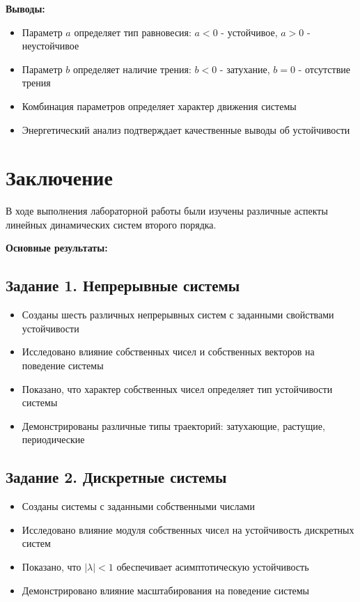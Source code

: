 \textbf{Выводы:}
\begin{itemize}
    \item Параметр $a$ определяет тип равновесия: $a < 0$ - устойчивое, $a > 0$ - неустойчивое
    \item Параметр $b$ определяет наличие трения: $b < 0$ - затухание, $b = 0$ - отсутствие трения
    \item Комбинация параметров определяет характер движения системы
    \item Энергетический анализ подтверждает качественные выводы об устойчивости
\end{itemize}

\section*{Заключение}

В ходе выполнения лабораторной работы были изучены различные аспекты линейных динамических систем второго порядка.

\textbf{Основные результаты:}

\subsection*{Задание 1. Непрерывные системы}

\begin{itemize}
    \item Созданы шесть различных непрерывных систем с заданными свойствами устойчивости
    \item Исследовано влияние собственных чисел и собственных векторов на поведение системы
    \item Показано, что характер собственных чисел определяет тип устойчивости системы
    \item Демонстрированы различные типы траекторий: затухающие, растущие, периодические
\end{itemize}

\subsection*{Задание 2. Дискретные системы}

\begin{itemize}
    \item Созданы системы с заданными собственными числами
    \item Исследовано влияние модуля собственных чисел на устойчивость дискретных систем
    \item Показано, что $|\lambda| < 1$ обеспечивает асимптотическую устойчивость
    \item Демонстрировано влияние масштабирования на поведение системы
\end{itemize}

